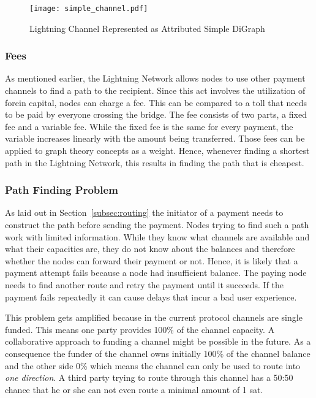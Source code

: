 \documentclass[final]{fhnwreport}       %
\begin{document}
\begin{figure}[H]
\centering
\texttt{[image: simple\_channel.pdf]}
\caption{Lightning Channel Represented as Attributed Simple DiGraph}
\label{fig:channel_graph}
\end{figure}

\subsubsection{Fees}
As mentioned earlier, the Lightning Network allows nodes to use other payment channels to find a path to the recipient. Since this act involves the utilization of forein capital, nodes can charge a fee. This can be compared to a toll that needs to be paid by everyone crossing the bridge. The fee consists of two parts, a fixed fee and a variable fee. While the fixed fee is the same for every payment, the variable increases linearly with the amount being transferred. Those fees can be applied to graph theory concepts as a weight. Hence, whenever finding a shortest path in the Lightning Network, this results in finding the path that is cheapest.

\subsubsection{Path Finding Problem}\label{subsubsec:pproblem}
As laid out in Section~\ref{subsec:routing} the initiator of a payment needs to construct the path before sending the payment. Nodes trying to find such a path work with limited information. While they know what channels are available and what their capacities are, they do not know about the balances and therefore whether the nodes can forward their payment or not. Hence, it is likely that a payment attempt fails because a node had insufficient balance. The paying node needs to find another route and retry the payment until it succeeds. If the payment fails repeatedly it can cause delays that incur a bad user experience.

This problem gets amplified because in the current protocol channels are single funded. This means one party provides 100\% of the channel capacity. A collaborative approach to funding a channel might be possible in the future. As a consequence the funder of the channel owns initially 100\% of the channel balance and the other side 0\% which means the channel can only be used to route into \emph{one direction}. A third party trying to route through this channel has a 50:50 chance that he or she can not even route a minimal amount of 1 sat. 
\end{document}
